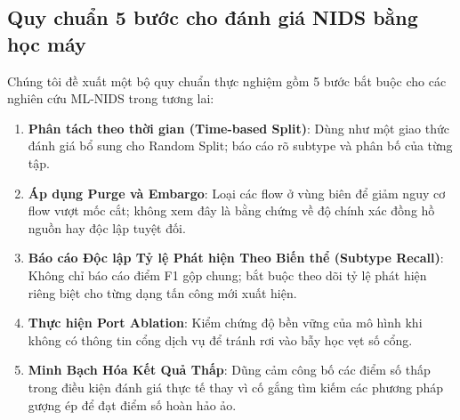 \subsection{Quy chuẩn 5 bước cho đánh giá NIDS bằng học máy}
Chúng tôi đề xuất một bộ quy chuẩn thực nghiệm gồm 5 bước bắt buộc cho các nghiên cứu ML-NIDS trong tương lai:
\begin{enumerate}
    \item \textbf{Phân tách theo thời gian (Time-based Split)}: Dùng như một giao thức đánh giá bổ sung cho Random Split; báo cáo rõ subtype và phân bố của từng tập.
    \item \textbf{Áp dụng Purge và Embargo}: Loại các flow ở vùng biên để giảm nguy cơ flow vượt mốc cắt; không xem đây là bằng chứng về độ chính xác đồng hồ nguồn hay độc lập tuyệt đối.
    \item \textbf{Báo cáo Độc lập Tỷ lệ Phát hiện Theo Biến thể (Subtype Recall)}: Không chỉ báo cáo điểm F1 gộp chung; bắt buộc theo dõi tỷ lệ phát hiện riêng biệt cho từng dạng tấn công mới xuất hiện.
    \item \textbf{Thực hiện Port Ablation}: Kiểm chứng độ bền vững của mô hình khi không có thông tin cổng dịch vụ để tránh rơi vào bẫy học vẹt số cổng.
    \item \textbf{Minh Bạch Hóa Kết Quả Thấp}: Dũng cảm công bố các điểm số thấp trong điều kiện đánh giá thực tế thay vì cố gắng tìm kiếm các phương pháp gượng ép để đạt điểm số hoàn hảo ảo.
\end{enumerate}
